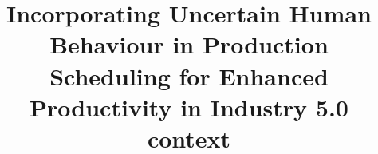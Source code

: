 \documentclass[review,12pt, 3p, times]{elsarticle}
\begin{document}
\begin{frontmatter}



\title{Incorporating Uncertain Human Behaviour in Production Scheduling for Enhanced Productivity in Industry 5.0 context}







\end{frontmatter}
\end{document}
